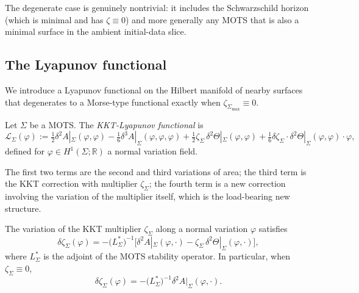 The degenerate case is genuinely nontrivial: it includes the Schwarzschild horizon (which is minimal and has $\zeta\equiv 0$) and more generally any MOTS that is also a minimal surface in the ambient initial-data slice.

\subsection{The Lyapunov functional}

We introduce a Lyapunov functional on the Hilbert manifold of nearby surfaces that degenerates to a Morse-type functional exactly when $\zeta_{\Sigma_{\max}}\equiv 0$.

\begin{definition}\label{def:KKTLyapunov}
Let $\Sigma$ be a MOTS. The \emph{KKT-Lyapunov functional} is
\begin{equation}\label{eq:KKTLyapunovDef}
    \mathcal L_\Sigma(\varphi)
    :=
    \tfrac12\delta^2 A|_\Sigma(\varphi,\varphi)
    -\tfrac{1}{6}\delta^3 A|_\Sigma(\varphi,\varphi,\varphi)
    +\tfrac{1}{2}\zeta_\Sigma\,\delta^2\Theta|_\Sigma(\varphi,\varphi)
    +\tfrac{1}{6}\delta\zeta_\Sigma\cdot\delta^2\Theta|_\Sigma(\varphi,\varphi)\cdot\varphi,
\end{equation}
defined for $\varphi\in H^1(\Sigma;\mathbb R)$ a normal variation field.
\end{definition}

The first two terms are the second and third variations of area; the third term is the KKT correction with multiplier $\zeta_\Sigma$; the fourth term is a new correction involving the variation of the multiplier itself, which is the load-bearing new structure.

\begin{lemma}\label{lem:VariationKKTMult}
The variation of the KKT multiplier $\zeta_\Sigma$ along a normal variation $\varphi$ satisfies
\begin{equation}\label{eq:KKTMultVariation}
    \delta\zeta_\Sigma(\varphi)
    =
    -\bigl(L_\Sigma^*\bigr)^{-1}\bigl[\delta^2 A|_\Sigma(\varphi,\cdot)-\zeta_\Sigma\,\delta^2\Theta|_\Sigma(\varphi,\cdot)\bigr],
\end{equation}
where $L_\Sigma^*$ is the adjoint of the MOTS stability operator. In particular, when $\zeta_\Sigma\equiv 0$,
\[
    \delta\zeta_\Sigma(\varphi)=-\bigl(L_\Sigma^*\bigr)^{-1}\delta^2 A|_\Sigma(\varphi,\cdot).
\]
\end{lemma}

